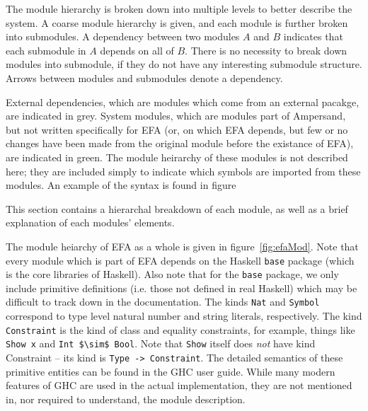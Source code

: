 The module hierarchy is broken down into multiple levels to better describe the
system.  A coarse module hierarchy is given, and each module is further broken
into submodules.  A dependency between two modules $A$ and $B$ indicates that
each submodule in $A$ depends on all of $B$. There is no necessity to break
down modules into submodule, if they do not have any interesting submodule 
structure. Arrows between modules and submodules denote a dependency. 

External dependencies, which are modules which come from an external pacakge,
are indicated in {\color{grey}grey}. System modules, which are modules part of
Ampersand, but not written specifically for EFA (or, on which EFA depends, but
few or no changes have been made from the original module before the existance
of EFA), are indicated in {\color{applegreen}green}. The module heirarchy of
these modules is not described here; they are included simply to indicate which
symbols are imported from these modules. An example of the syntax is found in
figure%

This section contains a hierarchal breakdown of each module, as well as a brief
explanation of each modules' elements. 

The module heiarchy of EFA as a whole is given in figure~\ref{fig:efaMod}.  Note
that every module which is part of EFA depends on the Haskell \texttt{base} 
package
(which is the core libraries of Haskell). Also note that for the \texttt{base}
package, we only include primitive definitions (i.e. those not defined in real
Haskell) which may be difficult to track down in the documentation. The kinds
\lstinline{Nat} and \lstinline{Symbol} correspond to type level natural number 
and string
literals, respectively. The kind \lstinline{Constraint} is the kind of class and
equality constraints, for example, things like \lstinline{Show x} and 
\lstinline[mathescape]|Int $\sim$ Bool|.  
Note that \texttt{Show} itself does \emph{not} have kind Constraint --
its kind is \lstinline{Type -> Constraint}. The detailed semantics of these
primitive entities can be found in the GHC user guide\citep{ghcUserGuide}. While
many modern features of GHC are used in the actual implementation, they are not
mentioned in, nor required to understand, the module description.

